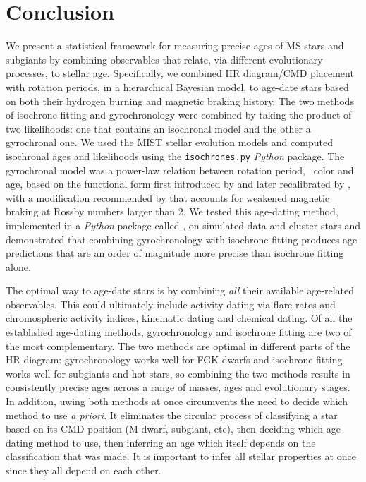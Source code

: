 \section{Conclusion}
\label{section:conclusion}

We present a statistical framework for measuring precise ages of MS stars and
subgiants by combining observables that relate, via different evolutionary
processes, to stellar age.
Specifically, we combined HR diagram/CMD placement with rotation periods, in a
hierarchical Bayesian model, to age-date stars based on both their hydrogen
burning and magnetic braking history.
The two methods of isochrone fitting and gyrochronology were combined by
taking the product of two likelihoods: one that contains an isochronal model
and the other a gyrochronal one.
We used the MIST stellar evolution models and computed isochronal ages and
likelihoods using the {\tt isochrones.py} {\it Python} package.
The gyrochronal model was a power-law relation between rotation period,
\gcolor\
color and age, based on the functional form first introduced by
\citet{barnes2003} and later recalibrated by \citet{angus2015}, with a
modification recommended by \citet{vansaders2016} that accounts for weakened
magnetic braking at Rossby numbers larger than 2.
We tested this age-dating method, implemented in a {\it Python} package called
\sd, on simulated data and cluster stars and demonstrated that combining
gyrochronology with isochrone fitting produces age predictions that are an
order of magnitude more precise than isochrone fitting alone.

The optimal way to age-date stars is by combining {\it all} their available
age-related observables.
This could ultimately include activity dating via flare rates and
chromospheric activity indices, kinematic dating and chemical dating.
Of all the established age-dating methods, gyrochronology and isochrone
fitting are two of the most complementary.
The two methods are optimal in different parts of the HR diagram:
gyrochronology works well for FGK dwarfs and isochrone fitting works well for
subgiants and hot stars, so combining the two methods results in consistently
precise ages across a range of masses, ages and evolutionary stages.
In addition, uwing both methods at once circumvents the need to decide which
method to use {\it a priori}.
It eliminates the circular process of classifying a star based on its CMD
position (M dwarf, subgiant, etc), then deciding which age-dating method to
use, then inferring an age which itself depends on the classification that was
made.
It is important to infer all stellar properties at once since they all depend
on each other.

